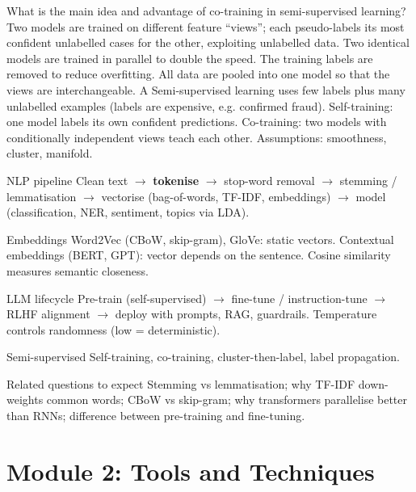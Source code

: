 {What is the main idea and advantage of co-training in semi-supervised learning?}
{Two models are trained on different feature ``views''; each pseudo-labels its most confident unlabelled cases for the other, exploiting unlabelled data.}
{Two identical models are trained in parallel to double the speed.}
{The training labels are removed to reduce overfitting.}
{All data are pooled into one model so that the views are interchangeable.}
{A}
{Semi-supervised learning uses few labels plus many unlabelled examples (labels are expensive, e.g. confirmed fraud). Self-training: one model labels its own confident predictions. Co-training: two models with conditionally independent views teach each other. Assumptions: smoothness, cluster, manifold.}

{\begin{block}{NLP pipeline}
		Clean text $\rightarrow$ \textbf{tokenise} $\rightarrow$ stop-word removal $\rightarrow$ stemming / lemmatisation $\rightarrow$ vectorise (bag-of-words, TF-IDF, embeddings) $\rightarrow$ model (classification, NER, sentiment, topics via LDA).
	\end{block}
	\begin{block}{Embeddings}
		Word2Vec (CBoW, skip-gram), GloVe: static vectors. Contextual embeddings (BERT, GPT): vector depends on the sentence. Cosine similarity measures semantic closeness.
\end{block}}
{\begin{block}{LLM lifecycle}
		Pre-train (self-supervised) $\rightarrow$ fine-tune / instruction-tune $\rightarrow$ RLHF alignment $\rightarrow$ deploy with prompts, RAG, guardrails. Temperature controls randomness (low = deterministic).
	\end{block}
	\begin{block}{Semi-supervised}
		Self-training, co-training, cluster-then-label, label propagation.
	\end{block}
	\begin{alertblock}{Related questions to expect}
		Stemming vs lemmatisation; why TF-IDF down-weights common words; CBoW vs skip-gram; why transformers parallelise better than RNNs; difference between pre-training and fine-tuning.
\end{alertblock}}
\section{Module 2: Tools and Techniques}

